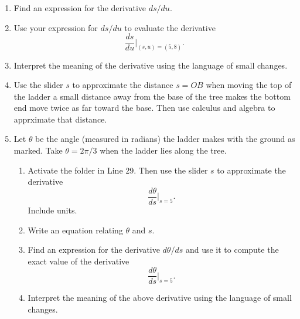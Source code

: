 \documentclass{ximera}
\begin{document}
\begin{question}
\begin{enumerate}
\item Find an expression for the derivative $ds/du$.

\item Use your expression for $ds/du$ to evaluate the derivative
\[
\frac{ds}{du}\Big|_{(s,u) = (5,8)} .
\]

\item Interpret the meaning of the derivative using the language of small changes.

\item Use the slider $s$ to approximate the distance $s=OB$ when moving the top of the ladder a small distance away from the base of the tree makes the bottom end move twice as far toward the base. Then use calculus and algebra to apprximate that distance.

\item Let $\theta$ be the angle (measured in radians) the ladder makes with the ground as marked. Take $\theta=2\pi/3$ when the ladder lies along the tree.

\begin{enumerate}
\item Activate the folder in Line 29. Then use the slider $s$ to approximate the derivative 
\[
\frac{d\theta}{ds}\Big|_{s=5} .
\]
Include units.

\item Write an equation relating $\theta$ and $s$.

\item Find an expression for the derivative $d\theta/ds$ and use it to compute the exact value of the derivative
\[
\frac{d\theta}{ds}\Big|_{s=5} .
\]

\item Interpret the meaning of the above derivative using the language of small changes.

\end{enumerate}



\end{enumerate}

\end{question}
\end{document}
